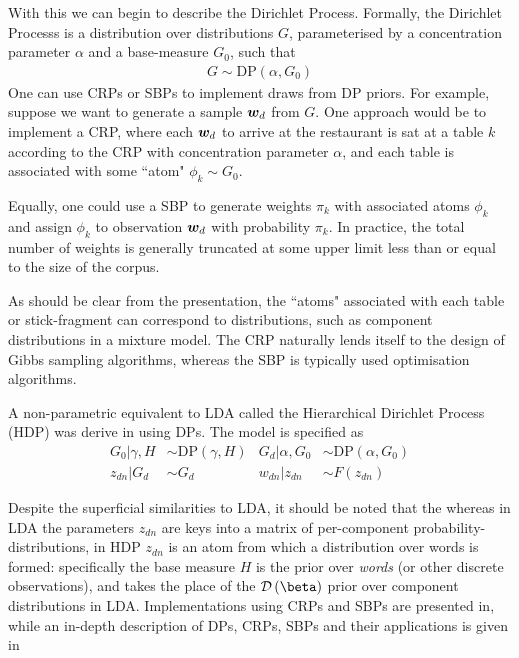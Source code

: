 With this we can begin to describe the Dirichlet Process. Formally, the Dirichlet Processs is a distribution over distributions $G$, parameterised by a concentration parameter $\alpha$ and a base-measure $G_0$, such that
\begin{align}
G \sim \text{DP}\left(\alpha, G_0\right)
\end{align}
One can use CRPs or SBPs to implement draws from DP priors. For example, suppose we want to generate a sample ${ \bm w_d }$ from $G$. One approach would be to implement a CRP\cite{Neal2000}, where each ${ \bm w_d }$ to arrive at the restaurant is sat at a table $k$ according to the CRP with concentration parameter $\alpha$, and each table is associated with some ``atom" $\phi_k \sim G_0$.

Equally, one could use a SBP\cite{Sethuraman1994} to generate weights $\pi_k$ with associated atoms $\phi_k$ and assign $\phi_k$ to observation ${ \bm w_d }$ with probability $\pi_k$. In practice, the total number of weights is generally truncated at some upper limit less than or equal to the size of the corpus. 

As should be clear from the presentation, the ``atoms" associated with each table or stick-fragment can correspond to distributions, such as component distributions in a mixture model. The CRP naturally lends itself to the design of Gibbs sampling algorithms, whereas the SBP is typically used optimisation algorithms. 

A non-parametric equivalent to LDA called the Hierarchical Dirichlet Process (HDP) was derive in \cite{Teh2006b} using DPs. The model is specified as
\begin{align}
G_0 | \gamma, H & \sim \text{DP}\left(\gamma, H \right) &
G_d | \alpha, G_0 & \sim \text{DP}\left(\alpha, G_0\right) \\
z_{dn} |G_d &\sim G_d & w_{dn} | z_{dn} & \sim F(z_{dn})
\end{align}

Despite the superficial similarities to LDA, it should be noted that the whereas in LDA the parameters $z_{dn}$ are keys into a matrix of per-component probability-distributions, in HDP $z_{dn}$ is an atom from which a distribution over words is formed: specifically the base measure $H$ is the prior over \emph{words} (or other discrete observations), and takes the place of the $\dir{\vv{\beta}}$ prior over component distributions in LDA. Implementations using CRPs and SBPs are presented in\cite{Teh2006b}, while an in-depth description of DPs, CRPs, SBPs and their applications is given in\cite{JordanMichael2005a}


